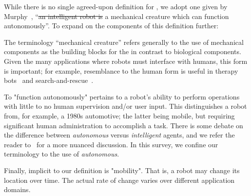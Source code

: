 While there is no single agreed-upon definition for , we adopt one given by Murphy~\cite{}, ``\sout{an intelligent robot is} a mechanical creature which can function autonomously''. To expand on the components of this definition further:





The terminology ``mechanical creature'' refers generally to the use of mechanical components as the building blocks for the  in contrast to biological components. Given the many applications where robots must interface with humans, this form is important; for example, resemblance to the human form is useful in therapy bots~\cite{} and search-and-rescue~\cite{Shin2017}. 

To "function autonomously" pertains to a robot's ability to perform operations with little to no human supervision and/or user input. This distinguishes a robot from, for example, a 1980s automotive; the latter being mobile, but requiring significant human administration to accomplish a task. There is some debate on the difference between {\it autonomous} versus {\it intelligent} agents, and we refer the reader to~\cite{} for a more nuanced discussion. In this survey, we confine our terminology to the use of {\it autonomous}.

Finally, implicit to our definition is "mobility". That is, a robot may change its location over time. The actual rate of change varies over different application domains. 


